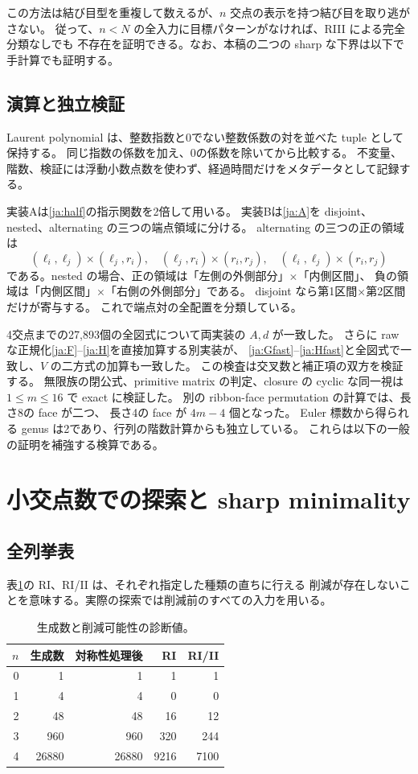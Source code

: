 \documentclass[12pt]{amsart}
\theoremstyle{definition}
\theoremstyle{remark}
\numberwithin{equation}{section}
\begin{document}
この方法は結び目型を重複して数えるが、$n$ 交点の表示を持つ結び目を取り逃がさない。
従って、$n<N$ の全入力に目標パターンがなければ、RIII による完全分類なしでも
不存在を証明できる。なお、本稿の二つの sharp な下界は以下で手計算でも証明する。

\subsection{演算と独立検証}
Laurent polynomial は、整数指数と0でない整数係数の対を並べた tuple として保持する。
同じ指数の係数を加え、0の係数を除いてから比較する。
不変量、階数、検証には浮動小数点数を使わず、経過時間だけをメタデータとして記録する。

実装Aは\eqref{ja:half}の指示関数を2倍して用いる。
実装Bは\eqref{ja:A}を disjoint、nested、alternating の三つの端点領域に分ける。
alternating の三つの正の領域は
\[
(\ell_i,\ell_j)\times(\ell_j,r_i),\quad
(\ell_j,r_i)\times(r_i,r_j),\quad
(\ell_i,\ell_j)\times(r_i,r_j)
\]
である。nested の場合、正の領域は「左側の外側部分」$\times$「内側区間」、
負の領域は「内側区間」$\times$「右側の外側部分」である。
disjoint なら第1区間$\times$第2区間だけが寄与する。
これで端点対の全配置を分類している。

4交点までの27,893個の全図式について両実装の $A,d$ が一致した。
さらに raw な正規化\eqref{ja:F}--\eqref{ja:H}を直接加算する別実装が、
\eqref{ja:Gfast}--\eqref{ja:Hfast}と全図式で一致し、$V$ の二方式の加算も一致した。
この検査は交叉数と補正項の双方を検証する。
無限族の閉公式、primitive matrix の判定、closure の cyclic な同一視は
$1\le m\le16$ で exact に検証した。
別の ribbon-face permutation の計算では、長さ8の face が二つ、
長さ4の face が $4m-4$ 個となった。
Euler 標数から得られる genus は2であり、行列の階数計算からも独立している。
これらは以下の一般の証明を補強する検算である。

\section{小交点数での探索と sharp minimality}
\subsection{全列挙表}
表\ref{ja:counts}の RI、RI/II は、それぞれ指定した種類の直ちに行える
削減が存在しないことを意味する。実際の探索では削減前のすべての入力を用いる。
\begin{table}[ht]
\centering\small
\caption{生成数と削減可能性の診断値。}\label{ja:counts}
\begin{tabular}{r r r r r}\toprule
$n$&生成数&対称性処理後&RI&RI/II\\\midrule
0&1&1&1&1\\1&4&4&0&0\\2&48&48&16&12\\
3&960&960&320&244\\4&26880&26880&9216&7100\\\bottomrule
\end{tabular}
\end{table}
\end{document}
